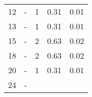 \begin{longtable}{lXrrr}
     12 &
     \multicolumn{1}{X}{ -  } &


       \num{1} &
       \num[round-mode=places,round-precision=2]{0.31} &
         \num[round-mode=places,round-precision=2]{0.01} \\

     13 &
     \multicolumn{1}{X}{ -  } &


       \num{1} &
       \num[round-mode=places,round-precision=2]{0.31} &
         \num[round-mode=places,round-precision=2]{0.01} \\

     15 &
     \multicolumn{1}{X}{ -  } &


       \num{2} &
       \num[round-mode=places,round-precision=2]{0.63} &
         \num[round-mode=places,round-precision=2]{0.02} \\

     18 &
     \multicolumn{1}{X}{ -  } &


       \num{2} &
       \num[round-mode=places,round-precision=2]{0.63} &
         \num[round-mode=places,round-precision=2]{0.02} \\

     20 &
     \multicolumn{1}{X}{ -  } &


       \num{1} &
       \num[round-mode=places,round-precision=2]{0.31} &
         \num[round-mode=places,round-precision=2]{0.01} \\

     24 &
     \multicolumn{1}{X}{ -  } &



\end{longtable}
